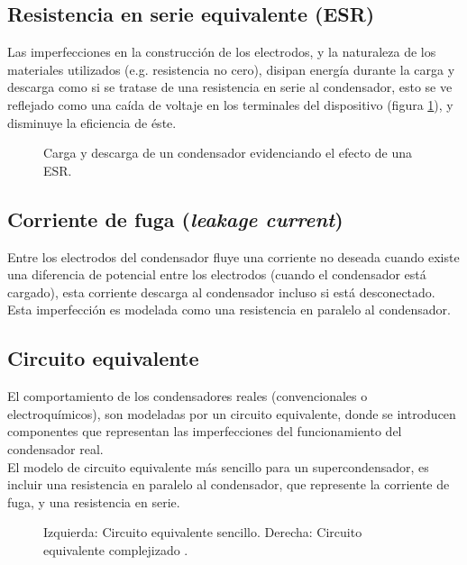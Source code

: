\subsection{Resistencia en serie equivalente (ESR)}
Las imperfecciones en la construcción de los electrodos, y la naturaleza de los materiales utilizados (e.g. resistencia no cero), disipan energía durante la carga y descarga como si se tratase de una resistencia en serie al condensador, esto se ve reflejado como una caída de voltaje en los terminales del dispositivo (figura \ref{fig:plot:charge-discharge_esr}), y disminuye la eficiencia de éste.

\begin{figure}[h!]
	\centering
	\caption{Carga y descarga de un condensador evidenciando el efecto de una ESR.}
	\label{fig:plot:charge-discharge_esr}
\end{figure}

\subsection{Corriente de fuga (\emph{leakage current})}
Entre los electrodos del condensador fluye una corriente no deseada cuando existe una diferencia de potencial entre los electrodos (cuando el condensador está cargado), esta corriente descarga al condensador incluso si está desconectado. Esta imperfección es modelada como una resistencia en paralelo al condensador.

\subsection{Circuito equivalente}
El comportamiento de los condensadores reales (convencionales o electroquímicos), son modeladas por un circuito equivalente, donde se introducen componentes que representan las imperfecciones del funcionamiento del condensador real.\\
El modelo de circuito equivalente más sencillo para un supercondensador, es incluir una resistencia en paralelo al condensador, que represente la corriente de fuga, y una resistencia en serie.

\begin{figure}
	\centering
	\caption{Izquierda: Circuito equivalente sencillo. Derecha: Circuito equivalente complejizado \citep{Fletcher2014}.}
	\label{fig:equiv_both}
\end{figure}

